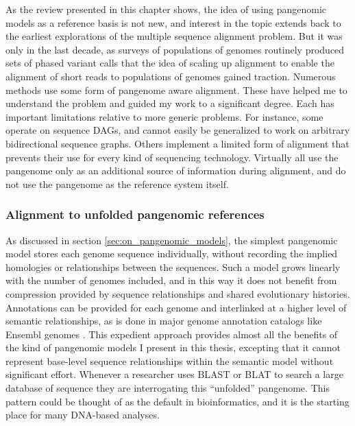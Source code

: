 As the review presented in this chapter shows, the idea of using pangenomic models as a reference basis is not new, and interest in the topic extends back to the earliest explorations of the multiple sequence alignment problem.
But it was only in the last decade, as surveys of populations of genomes routinely produced sets of phased variant calls \cite{liti2009population,weigel20091001,cao2011whole,1000Gphase1,1000g2015} that the idea of scaling up alignment to enable the alignment of short reads to populations of genomes gained traction.
Numerous methods use some form of pangenome aware alignment.
These have helped me to understand the problem and guided my work to a significant degree.
Each has important limitations relative to more generic problems.
For instance, some operate on sequence DAGs, and cannot easily be generalized to work on arbitrary bidirectional sequence graphs.
Others implement a limited form of alignment that prevents their use for every kind of sequencing technology.
Virtually all use the pangenome only as an additional source of information during alignment, and do not use the pangenome as the reference system itself.

\subsubsection{Alignment to unfolded pangenomic references}

As discussed in section \ref{sec:on_pangenomic_models}, the simplest pangenomic model stores each genome sequence individually, without recording the implied homologies or relationships between the sequences.
Such a model grows linearly with the number of genomes included, and in this way it does not benefit from compression provided by sequence relationships and shared evolutionary histories.
Annotations can be provided for each genome and interlinked at a higher level of semantic relationships, as is done in major genome annotation catalogs like Ensembl genomes \cite{kersey2015ensembl}.
This expedient approach provides almost all the benefits of the kind of pangenomic models I present in this thesis, excepting that it cannot represent base-level sequence relationships within the semantic model without significant effort.
Whenever a researcher uses BLAST or BLAT to search a large database of sequence they are interrogating this ``unfolded'' pangenome.
This pattern could be thought of as the default in bioinformatics, and it is the starting place for many DNA-based analyses.

